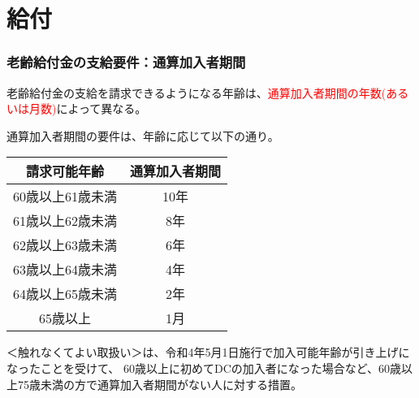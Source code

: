 \section{給付}


\subsubsection{老齢給付金の支給要件：通算加入者期間}

\begin{itembox}[l]{}
  老齢給付金の支給を請求できるようになる年齢は、\textcolor{red}{通算加入者期間の年数(あるいは月数)}によって異なる。
\end{itembox}

\begin{sol}
  \;

  通算加入者期間の要件は、年齢に応じて以下の通り。

  \begin{table}[h]
    \label{table:通算加入者期間の要件}
    \centering
    \begin{tabular}{cc} 
      \hline
      請求可能年齢 & 通算加入者期間   \\
      \hline \hline
      60歳以上61歳未満 & 10年  \\
      61歳以上62歳未満 & 8年   \\
      62歳以上63歳未満 & 6年\\
      63歳以上64歳未満 & 4年 \\
      64歳以上65歳未満 & 2年  \\
      65歳以上 & 1月 \\
      \hline
    \end{tabular}
  \end{table}
\end{sol}

\begin{shadebox}
  ＜触れなくてよい取扱い＞は、令和4年5月1日施行で加入可能年齢が引き上げになったことを受けて、
  60歳以上に初めてDCの加入者になった場合など、60歳以上75歳未満の方で通算加入者期間がない人に対する措置。
\end{shadebox}

\newpage